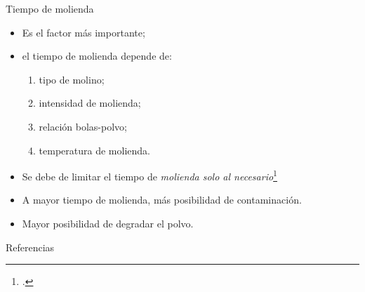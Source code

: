 \documentclass[%
spanish,
progressbar=head,
background=dark,
subsectionpage,
aspectratio=169
]{beamer}
\begin{document}
\begin{frame}{Tiempo de molienda}
    \begin{itemize}
        \item Es el factor más importante;
        \item el tiempo de molienda depende de:
            \begin{enumerate}
                \item tipo de molino;
                \item intensidad de molienda;
                \item relación bolas-polvo;
                \item temperatura de molienda.
            \end{enumerate}
    \end{itemize}
\end{frame}

\begin{frame}
    \begin{itemize}
        \item<1-> Se debe de limitar el tiempo de \emph{molienda solo al necesario}\footcite{SURYANARAYANA1995153}
        \item<2-> \alert<2>{A mayor tiempo de molienda, más posibilidad de contaminación.}
        \item<3-> \alert<3>{Mayor posibilidad de degradar el polvo.}
    \end{itemize}
    
\end{frame}

\begin{frame}[allowframebreaks]{Referencias}
    \small
    \printbibliography
\end{frame}
\end{document}
